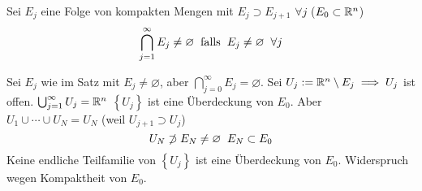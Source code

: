 \begin{Sat}
  Sei $E_j$ eine Folge von kompakten Mengen mit $E_j\supset E_{j+1}$ $\forall j$ ($E_0\subset\mathbb{R}^n$)
  \[\bigcap_{j=1}^\infty E_j\neq\varnothing\hspace{2mm}\text{falls}\hspace{2mm} E_j\neq\varnothing \hspace{2mm}\forall j\]
\end{Sat}
\begin{Bew}
  Sei $E_j$ wie im Satz mit $E_j\neq\varnothing$, aber $\bigcap_{j=0}^\infty E_j=\varnothing$. Sei $U_j:=\mathbb{R}^n\setminus E_j\implies U_j$ ist offen. $\bigcup_{j=1}^\infty U_j=\mathbb{R}^n$ $\left\{ U_j \right\}$ ist eine Überdeckung von $E_0$. Aber $U_1\cup\cdots\cup U_N=U_N$ (weil $U_{j+1}\supset U_j$)
  \[U_N\not\supset E_N\neq \varnothing\hspace{2mm} E_N\subset E_0\]
  Keine endliche Teilfamilie von $\left\{ U_j \right\}$ ist eine Überdeckung von $E_0$. Widerspruch wegen Kompaktheit von $E_0$.
\end{Bew}
